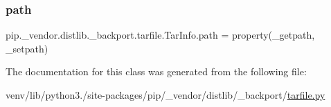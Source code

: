 \subsubsection{\texorpdfstring{path}{path}}
{\footnotesize\ttfamily pip.\+\_\+vendor.\+distlib.\+\_\+backport.\+tarfile.\+Tar\+Info.\+path = property(\+\_\+getpath, \+\_\+setpath)\hspace{0.3cm}{\ttfamily [static]}}



The documentation for this class was generated from the following file\+:\begin{DoxyCompactItemize}
\item 
venv/lib/python3./site-\/packages/pip/\+\_\+vendor/distlib/\+\_\+backport/\hyperlink{tarfile_8py}{tarfile.\+py}\end{DoxyCompactItemize}
